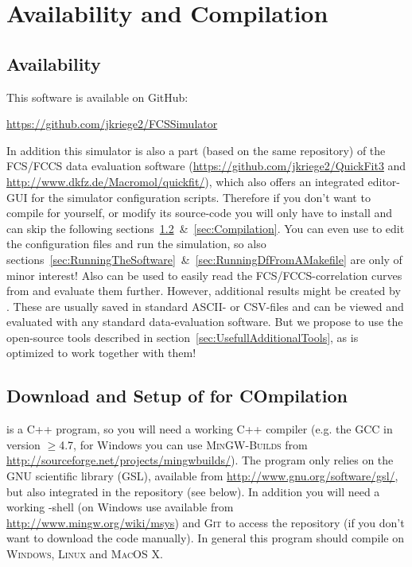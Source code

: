 
\chapter{Availability and Compilation}
\label{sec:availability_compilation}
\section{Availability}
\label{sec:Availability}
This software is available on GitHub:
\begin{center}
	\url{https://github.com/jkriege2/FCSSimulator}
\end{center}
In addition this simulator is also a part (based on the same repository) of the FCS/FCCS data evaluation software \qf (\url{https://github.com/jkriege2/QuickFit3} and \url{http://www.dkfz.de/Macromol/quickfit/}), which also offers an integrated editor-GUI for the simulator configuration scripts. Therefore if you don't want to compile \df for yourself, or modify its source-code you will only have to install \qf and can skip the following sections~\ref{sec:DownloadAndSetup}~\&~\ref{sec:Compilation}. You can even use \qf to edit the \df configuration files and run the simulation, so also sections~\ref{sec:RunningTheSoftware}~\&~\ref{sec:RunningDfFromAMakefile} are only of minor interest! Also \qf can be used to easily read the FCS/FCCS-correlation curves from \df and evaluate them further. However, additional results might be created by \df. These are usually saved in standard ASCII- or CSV-files and can be viewed and evaluated with any standard data-evaluation software. But we propose to use the open-source tools described in section~\ref{sec:UsefullAdditionalTools}, as \df is optimized to work together with them!

\section{Download and Setup of \df for COmpilation}
\label{sec:DownloadAndSetup}
\df is a C++ program, so you will need a working C++ compiler (e.g. the \textsc{GCC} in version $\geq$4.7, for Windows you can use \textsc{MinGW-Builds} from \url{http://sourceforge.net/projects/mingwbuilds/}). The program only relies on the GNU scientific library (GSL), available from \url{http://www.gnu.org/software/gsl/}, but also integrated in the repository (see below). In addition you will need a working \bash-shell (on Windows use \msys available from \url{http://www.mingw.org/wiki/msys}) and \textsc{Git} to access the repository (if you don't want to download the code manually). In general this program should compile on \textsc{Windows}, \textsc{Linux} and \textsc{MacOS X}.\\[10mm]

